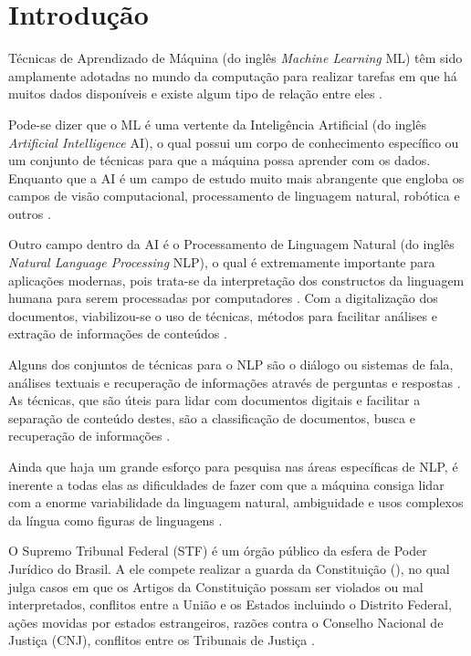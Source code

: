\chapter[Introdução]{Introdução}

Técnicas de Aprendizado de Máquina (do inglês \textit{Machine Learning} ML) têm sido amplamente adotadas no mundo da computação para realizar tarefas em que há muitos dados disponíveis e existe algum tipo de relação entre eles \cite{brink_real-world_2015}.

Pode-se dizer que o ML é uma vertente da Inteligência Artificial (do inglês \textit{Artificial Intelligence} AI), o qual possui um corpo de conhecimento específico ou um conjunto de técnicas para que a máquina possa aprender com os dados. Enquanto que a AI é um campo de estudo muito mais abrangente que engloba os campos de visão computacional, processamento de linguagem natural, robótica e outros \cite{brink_real-world_2015}. 

Outro campo dentro da AI é o Processamento de Linguagem Natural (do inglês \textit{Natural Language Processing} NLP), o qual é extremamente importante para aplicações modernas, pois trata-se da interpretação dos constructos da linguagem humana para serem processadas por computadores \cite{goldberg_neural_2017}.
Com a digitalização dos documentos, viabilizou-se o uso de técnicas, métodos para facilitar análises e extração de informações de conteúdos \cite{oliveira_automatic_2017}.

Alguns dos conjuntos de técnicas para o NLP são o diálogo ou sistemas de fala, análises textuais e recuperação de informações através de perguntas e respostas \cite{eslick_langutils:_2005}. As técnicas, que são úteis para lidar com documentos digitais e facilitar a separação de conteúdo destes, são a classificação de documentos, busca e recuperação de informações \cite{oliveira_automatic_2017}.

Ainda que haja um grande esforço para pesquisa nas áreas específicas de NLP, é inerente a todas elas as dificuldades de fazer com que a máquina consiga lidar com a enorme variabilidade da linguagem natural, ambiguidade e usos complexos da língua como figuras de linguagens \cite{goldberg_neural_2017}. 

O Supremo Tribunal Federal (STF) é um órgão público da esfera de Poder Jurídico do Brasil. A ele compete realizar a guarda da Constituição (\citeyear{brasil_constituicao_1988}), no qual julga casos em que os Artigos da Constituição possam ser violados ou mal interpretados, conflitos entre a União e os Estados incluindo o Distrito Federal, ações movidas por estados estrangeiros, razões contra o Conselho Nacional de Justiça (CNJ), conflitos entre os Tribunais de Justiça \cite{brasil_constituicao_1988}.

